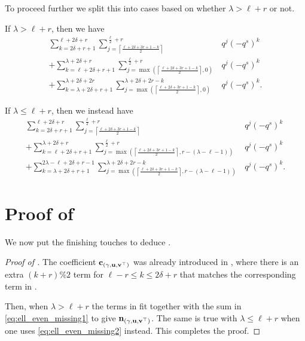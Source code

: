 To proceed further we split this into cases based on whether $\lambda > \ell+r$ or not.
\begin{itemize}
  \ii If $\lambda > \ell + r$, then we have
  \begin{equation}
  \begin{aligned}
    \sum_{k = 2 \delta + r + 1}^{\ell + 2\delta + r}
    \sum_{j = \left\lceil \frac{\ell + 2\delta + 3r + 1 - k}{2} \right\rceil}
      ^{\frac{\ell}{2} + r}
      & q^j (-q^s)^k \\
    + \sum_{k = \ell + 2 \delta + r + 1}^{\lambda + 2 \delta + r}
    \sum_{j=\max\left( \left\lceil \frac{\ell + 2\delta + 3r + 1 - k}{2} \right\rceil, 0\right)}
      ^{\frac{\ell}{2} + r}
      & q^j (-q^s)^k \\
    + \sum_{k = \lambda + 2\delta + r + 1}^{\lambda + 2 \delta + 2r}
    \sum_{j=\max\left( \left\lceil \frac{\ell + 2\delta + 3r + 1 - k}{2} \right\rceil, 0 \right)}
      ^{\lambda+2\delta+2r-k}
      & q^j (-q^s)^k.
  \end{aligned}
  \label{eq:ell_even_missing1}
  \end{equation}

  \ii If $\lambda \le \ell + r$, then we instead have
  \begin{equation}
  \begin{aligned}
    \sum_{k = 2 \delta + r + 1}^{\ell + 2\delta + r}
    \sum_{j = \left\lceil \frac{\ell + 2\delta + 3r + 1 - k}{2} \right\rceil}
      ^{\frac{\ell}{2} + r}
      & q^j (-q^s)^k \\
    + \sum_{k = \ell + 2 \delta + r + 1}^{\lambda + 2 \delta + r}
    \sum_{j=\max\left( \left\lceil \frac{\ell + 2\delta + 3r + 1 - k}{2} \right\rceil,
      r-(\lambda-\ell-1)\right)}
      ^{\frac{\ell}{2} + r}
      & q^j (-q^s)^k \\
    + \sum_{k = \lambda + 2\delta + r + 1}^{2\lambda - \ell + 2\delta + r - 1}
    \sum_{j=\max\left( \left\lceil \frac{\ell + 2\delta + 3r + 1 - k}{2} \right\rceil,
      r-(\lambda-\ell-1)\right)}^{\lambda+2\delta+2r-k}
      & q^j (-q^s)^k.
  \end{aligned}
  \label{eq:ell_even_missing2}
  \end{equation}
\end{itemize}

\section{Proof of }
We now put the finishing touches to deduce .
\begin{proof}
  [Proof of ]
  The coefficient $\mathbf c_{(\gamma, \mathbf u, \mathbf v^\top)}$ was already introduced in ,
  where there is an extra $(k+r)\%2$ term for $\ell-r \le k \le 2\delta+r$
  that matches the corresponding term in .

  Then, when $\lambda > \ell + r$ the terms in 
  fit together with the sum in \eqref{eq:ell_even_missing1} to give $\mathbf n_{(\gamma, \mathbf u, \mathbf v^\top)}$.
  The same is true with $\lambda \le \ell + r$
  when one uses \eqref{eq:ell_even_missing2} instead.
  This completes the proof.
\end{proof}

